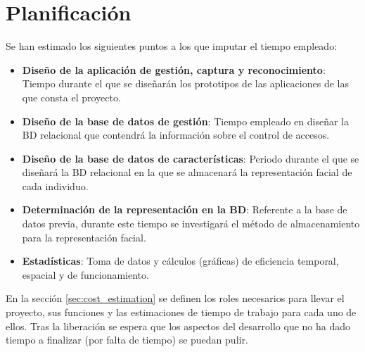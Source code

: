 
\section{Planificación}
Se han estimado los siguientes puntos a los que imputar el tiempo empleado:
\begin{itemize}
	\item{\textbf{Diseño de la aplicación de gestión, captura y reconocimiento}: Tiempo durante el que se diseñarán los prototipos de las aplicaciones de las que consta el proyecto.}
	\item{\textbf{Diseño de la base de datos de gestión}: Tiempo empleado en diseñar la BD relacional que contendrá la información sobre el control de accesos.}
	\item{\textbf{Diseño de la base de datos de características}: Periodo durante el que se diseñará la BD relacional en la que se almacenará la representación facial de cada individuo.}
	\item{\textbf{Determinación de la representación en la BD}: Referente a la base de datos previa, durante este tiempo se investigará el método de almacenamiento para la representación facial.}
	\item{\textbf{Estadísticas}: Toma de datos y cálculos (gráficas) de eficiencia temporal, espacial y de funcionamiento.}
\end{itemize}
En la sección \ref{sec:cost_estimation} se definen los roles necesarios para llevar el proyecto, sus funciones y las estimaciones de tiempo de trabajo para cada uno de ellos. Tras la liberación se espera que los aspectos del desarrollo que no ha dado tiempo a finalizar (por falta de tiempo) se puedan pulir.
